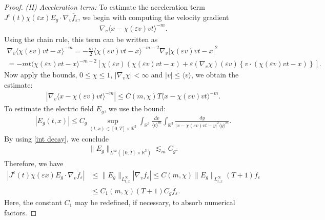 \documentclass[reqno,11pt,final]{amsart}
\theoremstyle{plain}
\numberwithin{equation}{section}
\numberwithin{theorem}{section}
\begin{document}
\begin{proof}
\noindent \textit{(II) Acceleration term:} To estimate the acceleration term $J^\varepsilon(t)\chi(\varepsilon x)E_g\cdot\nabla_v\overline{f}_\varepsilon$, we begin with computing the velocity gradient 
\begin{align*}
\nabla_v\langle x-\chi(\varepsilon v)vt\rangle^{-m}.
\end{align*}Using the chain rule, this term can be written as
\begin{multline*}
\nabla_v\langle \chi(\varepsilon v)vt - x\rangle^{-m} = -\frac{m}{2} \langle \chi(\varepsilon v)vt - x\rangle^{-m-2} \nabla_v|\chi(\varepsilon v)vt - x|^2\\
= -m t\langle \chi(\varepsilon v)vt - x\rangle^{-m-2}\left[\chi(\varepsilon v)(\chi(\varepsilon v)vt - x) + \varepsilon(\nabla_v\chi)(\varepsilon v)\left\{v\cdot(\chi(\varepsilon v)vt - x)\right\}\right].
\end{multline*}Now apply the bounds, $0\le \chi\le1$, $|\nabla_v\chi|<\infty$ and $|v|\le\langle v\rangle$, we obtain the estimate:
\begin{align}\label{v grad}
|\nabla_v\langle x-\chi(\varepsilon v)vt\rangle^{-m}| \le C(m,\chi)T\langle x-\chi(\varepsilon v)vt\rangle^{-m}.
\end{align}
To estimate the electric field $E_g$, we use the bound:
\begin{align*}
|E_g(t,x)| \le C_g\sup_{(t,x)\in[0,T]\times\mathbb{R}^3} \int_{\mathbb{R}^3} \frac{dv}{\langle v\rangle^m} \int_{\mathbb{R}^3} \frac{dy}{|x-\chi(\varepsilon v)vt-y|^2\langle y \rangle^m}.
\end{align*}By using \eqref{int decay}, we conclude 
\begin{align}\label{E bound}
\lVert E_g\rVert_{L^\infty([0,T]\times\mathbb{R}^3)} \lesssim_m C_g.
\end{align}
Therefore, we have
\begin{align}
|J^\varepsilon(t)\chi(\varepsilon x)E_g \cdot\nabla_v\overline{f}_\varepsilon| &\le \lVert E_g\rVert_{L^\infty_{t,x}} |\nabla_v\overline{f}_\varepsilon| \le C(m,\chi)\lVert E_g\rVert_{L^\infty_{t,x}} (T+1)\overline{f}_\varepsilon\nonumber\\
&\le C_1(m,\chi)(T+1)C_g\overline{f}_\varepsilon.\label{Acc est}
\end{align}Here, the constant $C_1$ may be redefined, if necessary, to absorb numerical factors.


\end{proof}
\end{document}
